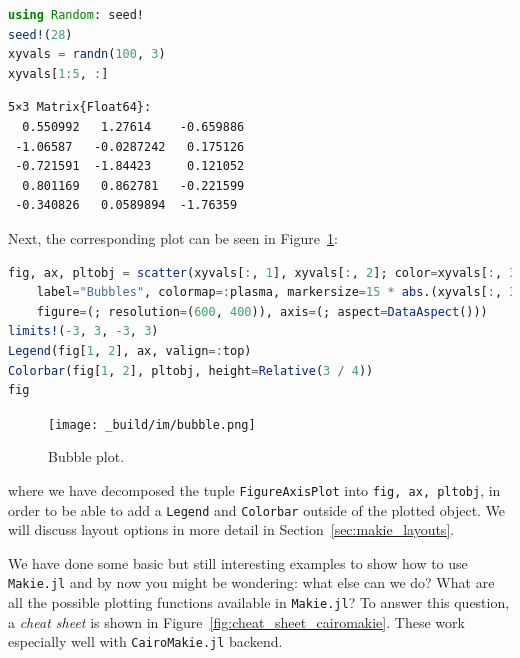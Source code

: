 \documentclass[
  notoc %
]{tufte-book}
\newcommand{\passthrough}[1]{#1}
\begin{document}
\begin{lstlisting}[language=Julia]
using Random: seed!
seed!(28)
xyvals = randn(100, 3)
xyvals[1:5, :]
\end{lstlisting}

\begin{lstlisting}[language=Output]
5×3 Matrix{Float64}:
  0.550992   1.27614    -0.659886
 -1.06587   -0.0287242   0.175126
 -0.721591  -1.84423     0.121052
  0.801169   0.862781   -0.221599
 -0.340826   0.0589894  -1.76359
\end{lstlisting}

Next, the corresponding plot can be seen in Figure~\ref{fig:bubble}:

\begin{lstlisting}[language=Julia]
fig, ax, pltobj = scatter(xyvals[:, 1], xyvals[:, 2]; color=xyvals[:, 3],
    label="Bubbles", colormap=:plasma, markersize=15 * abs.(xyvals[:, 3]),
    figure=(; resolution=(600, 400)), axis=(; aspect=DataAspect()))
limits!(-3, 3, -3, 3)
Legend(fig[1, 2], ax, valign=:top)
Colorbar(fig[1, 2], pltobj, height=Relative(3 / 4))
fig
\end{lstlisting}

\begin{figure}
\hypertarget{fig:bubble}{%
\centering
\texttt{[image: \_build/im/bubble.png]}
\caption{Bubble plot.}\label{fig:bubble}
}
\end{figure}

where we have decomposed the tuple
\passthrough{\lstinline!FigureAxisPlot!} into
\passthrough{\lstinline!fig, ax, pltobj!}, in order to be able to add a
\passthrough{\lstinline!Legend!} and \passthrough{\lstinline!Colorbar!}
outside of the plotted object. We will discuss layout options in more
detail in Section~\ref{sec:makie_layouts}.

We have done some basic but still interesting examples to show how to
use \passthrough{\lstinline!Makie.jl!} and by now you might be
wondering: what else can we do? What are all the possible plotting
functions available in \passthrough{\lstinline!Makie.jl!}? To answer
this question, a \emph{cheat sheet} is shown in
Figure~\ref{fig:cheat_sheet_cairomakie}. These work especially well with
\passthrough{\lstinline!CairoMakie.jl!} backend.
\end{document}

